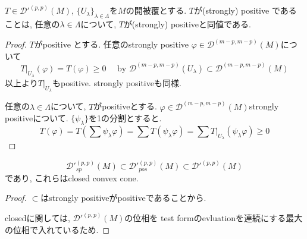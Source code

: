 \begin{tcolorbox}[mybox]
\begin{lem}
\label{lem-M-7.4.2}
$T \in {\mathcal{D}'}^{(p,p)}(M)$, $\{U_\lambda \}_{\lambda \in \Lambda}$を$M$の開被覆とする. 
$T$が(strongly) positive であることは, 任意の$\lambda \in \Lambda$について, $T$が(strongly) positiveと同値である.  
\end{lem}
\end{tcolorbox}
\begin{proof}
$T$がpositive とする. 
任意のstrongly positive $\varphi \in  \mathcal{D}^{(m-p,m-p)}(M)$について
$$
T|_{U_\lambda}(\varphi )
=T(\varphi) \ge 0
\quad\text{ by }
\mathcal{D}^{(m-p,m-p)}(U_\lambda) \subset \mathcal{D}^{(m-p,m-p)}(M) 
$$
以上より$T|_{U_\lambda}$もpositive. strongly positiveも同様.

任意の$\lambda \in \Lambda$について, $T$がpositiveとする. 
$\varphi \in  \mathcal{D}^{(m-p,m-p)}(M)$strongly positiveについて. 
$\{\psi_\lambda\}$を1の分割とすると.
$$
T(\varphi)
= T(\sum \psi_\lambda \varphi)
= \sum T(\psi_\lambda \varphi) 
=\sum T|_{U_\lambda}(\psi_\lambda \varphi) 
 \ge 0
$$
\end{proof}



\begin{tcolorbox}[mybox]
\begin{lem}
\label{lem-M-7.4.3}
$$
{\mathcal{D}'}^{(p,p)}_{sp}(M) 
\subset 
{\mathcal{D}'}^{(p,p)}_{pos}(M)
\subset 
{\mathcal{D}'}^{(p,p)}(M)
$$
であり, これらはclosed convex cone.
\end{lem}
\end{tcolorbox}
\begin{proof}
$\subset$はstrongly positiveがpositiveであることから.

closedに関しては, ${\mathcal{D}'}^{(p,p)}(M)$の位相を
test formのevluationを連続にする最大の位相で入れているため.
\end{proof}

